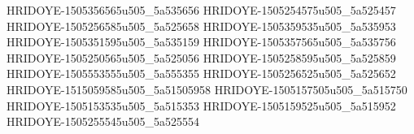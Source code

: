 HRIDOYE-1505356565u505_5a535656
HRIDOYE-1505254575u505_5a525457
HRIDOYE-1505256585u505_5a525658
HRIDOYE-1505359535u505_5a535953
HRIDOYE-1505351595u505_5a535159
HRIDOYE-1505357565u505_5a535756
HRIDOYE-1505250565u505_5a525056
HRIDOYE-1505258595u505_5a525859
HRIDOYE-1505553555u505_5a555355
HRIDOYE-1505256525u505_5a525652
HRIDOYE-1515059585u505_5a51505958
HRIDOYE-1505157505u505_5a515750
HRIDOYE-1505153535u505_5a515353
HRIDOYE-1505159525u505_5a515952
HRIDOYE-1505255545u505_5a525554
